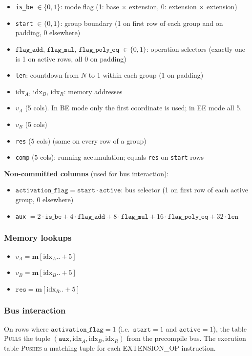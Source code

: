 \documentclass{article}
\theoremstyle{definition}
\begin{document}
\begin{itemize}
    \item \texttt{is\_be} $\in \{0,1\}$: mode flag (1: base $\times$ extension, 0: extension $\times$ extension)
    \item \texttt{start} $\in \{0,1\}$: group boundary (1 on first row of each group and on padding, 0 elsewhere)
    \item $\texttt{flag\_add}$, $\texttt{flag\_mul}$, $\texttt{flag\_poly\_eq}$ $\in \{0,1\}$: operation selectors (exactly one is 1 on active rows, all 0 on padding)
    \item \texttt{len}: countdown from $N$ to 1 within each group (1 on padding)
    \item $\text{idx}_A$, $\text{idx}_B$, $\text{idx}_R$: memory addresses
    \item $v_A$ (5 cols). In BE mode only the first coordinate is used; in EE mode all 5.
    \item $v_B$ (5 cols)
    \item \texttt{res} (5 cols) (same on every row of a group)
    \item \texttt{comp} (5 cols): running accumulation; equals \texttt{res} on \texttt{start} rows
\end{itemize}

\textbf{Non-committed columns} (used for bus interaction):
\begin{itemize}
    \item $\texttt{activation\_flag} = \texttt{start} \cdot \texttt{active}$: bus selector (1 on first row of each active group, 0 elsewhere)
    \item \texttt{aux} $= 2 \cdot \texttt{is\_be} + 4 \cdot \texttt{flag\_add} + 8 \cdot \texttt{flag\_mul} + 16 \cdot \texttt{flag\_poly\_eq} + 32 \cdot \texttt{len}$
\end{itemize}

\subsubsection{Memory lookups}
\begin{itemize}
    \item $v_A = \textbf{m}[\text{idx}_A..+5]$
    \item $v_B = \textbf{m}[\text{idx}_B..+5]$
    \item $\texttt{res} = \textbf{m}[\text{idx}_R..+5]$
\end{itemize}

\subsubsection{Bus interaction}
On rows where $\texttt{activation\_flag} = 1$ (i.e.\ $\texttt{start} = 1$ and $\texttt{active} = 1$), the table \textsc{Pulls} the tuple $(\texttt{aux}, \text{idx}_A, \text{idx}_B, \text{idx}_R)$ from the precompile bus. The execution table \textsc{Pushes} a matching tuple for each EXTENSION\_OP instruction.
\end{document}
